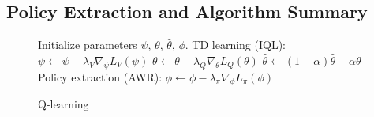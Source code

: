 \subsection{Policy Extraction and Algorithm Summary}

\begin{figure}
    \begin{minipage}{0.35\textwidth}
        \begin{algorithm}[H]
            \caption{\Ournamepref Q-learning}
            \begin{algorithmic}
            \label{alg:iql}
                \State Initialize parameters $\psi$, $\theta$, $\hat{\theta}$, $\phi$.
                \State TD learning (IQL):
                \State $\psi \leftarrow \psi - \lambda_V \nabla_\psi L_V(\psi)$ 
                \State $\theta \leftarrow \theta - \lambda_Q \nabla_{\theta} L_Q(\theta)$
                \State $\hat{\theta} \leftarrow (1-\alpha)\hat{\theta} + \alpha\theta$
                \EndFor
                \State Policy extraction (AWR):
                \State $\phi \leftarrow \phi - \lambda_\pi \nabla_\phi L_\pi(\phi)$
                \EndFor
            \end{algorithmic}
        \end{algorithm}
    \end{minipage}
\end{figure}

